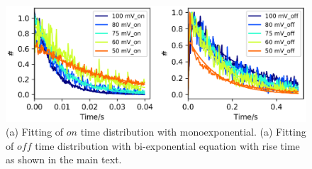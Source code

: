 \documentclass[11pt,a4paper,onecolumn]{article}
\begin{document}
\begin{figure}
  \centering
  \includegraphics{rate_fit_all_potential.eps}
  \makeatletter
  \renewcommand{\fnum@figure}{\figurename~S\thefigure}
  \makeatother
  \caption{(a) Fitting of $on$ time distribution with monoexponential. (a) Fitting of $off$ time distribution with bi-exponential equation with rise time as shown in the main text.}
  \label{SIfig: rate_fit_all_potential}
\end{figure}

\pagebreak

\end{document}
